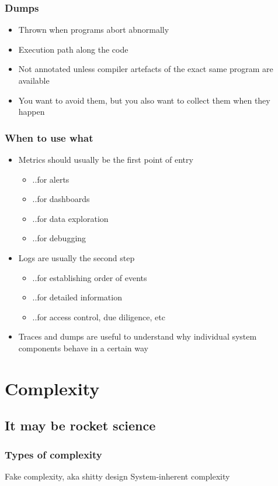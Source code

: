 \documentclass[t]{beamer}
\begin{document}
\begin{frame}
	\frametitle{Dumps}
	\begin{itemize}
		\item Thrown when programs abort abnormally
		\item Execution path along the code
		\item Not annotated unless compiler artefacts of the exact same program are available
		\item You want to avoid them, but you also want to collect them when they happen
	\end{itemize}
\end{frame}

\begin{frame}
	\frametitle{When to use what}
	\begin{itemize}
		\item Metrics should usually be the first point of entry
		\begin{itemize}
			\item ..for alerts
			\item ..for dashboards
			\item ..for data exploration
			\item ..for debugging
		\end{itemize}
		\item Logs are usually the second step
		\begin{itemize}
			\item ..for establishing order of events
			\item ..for detailed information
			\item ..for access control, due diligence, etc
		\end{itemize}
		\item Traces and dumps are useful to understand why individual system components behave in a certain way
	\end{itemize}
\end{frame}



\section{Complexity}


\subsection{It may be rocket science}

\begin{frame}
	\frametitle{Types of complexity}
	\begin{center}
		\vfill
		Fake complexity, aka shitty design
		\vfill
		System-inherent complexity
		\vfill
	\end{center}
\end{frame}
\end{document}
